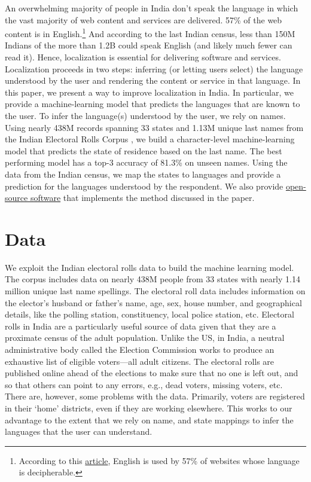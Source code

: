 \documentclass[11pt,  letterpaper]{article}
\begin{document}
An overwhelming majority of people in India don’t speak the language in which the vast majority of web content and services are delivered. 57\% of the web content is in English.\footnote{According to this \href{https://w3techs.com/technologies/overview/content_language}{article}, English is used by 57\% of websites whose language is decipherable.} And according to the last Indian census, less than 150M Indians of the more than 1.2B could speak English (and likely much fewer can read it). Hence, localization is essential for delivering software and services. Localization proceeds in two steps: inferring (or letting users select) the language understood by the user and rendering the content or service in that language. In this paper, we present a way to improve localization in India. In particular, we provide a machine-learning model that predicts the languages that are known to the user. To infer the language(s) understood by the user, we rely on names. Using nearly 438M records spanning 33 states and 1.13M unique last names from the Indian Electoral Rolls Corpus \citep{DVN/OG47IV_2023}, we build a character-level machine-learning model that predicts the state of residence based on the last name. The best performing model has a top-3 accuracy of 81.3\%  on unseen names. Using the data from the Indian census, we map the states to languages and provide a prediction for the languages understood by the respondent. We also provide \href{https://github.com/in-rolls/instate}{open-source software} that implements the method discussed in the paper. 


\section{Data}

We exploit the Indian electoral rolls data \citep{DVN/OG47IV_2023, DVN/MUEGDT_2018} to build the machine learning model. The corpus includes data on nearly 438M people from 33 states with nearly 1.14 million unique last name spellings. The electoral roll data includes information on the elector's husband or father’s name, age, sex, house number, and geographical details, like the polling station, constituency, local police station, etc. Electoral rolls in India are a particularly useful source of data given that they are a proximate census of the adult population. Unlike the US, in India, a neutral administrative body called the Election Commission works to produce an exhaustive list of eligible voters—all adult citizens. The electoral rolls are published online ahead of the elections to make sure that no one is left out, and so that others can point to any errors, e.g., dead voters, missing voters, etc. There are, however, some problems with the data. Primarily, voters are registered in their `home’ districts, even if they are working elsewhere. This works to our advantage to the extent that we rely on name, and state mappings to infer the languages that the user can understand.
\end{document}
